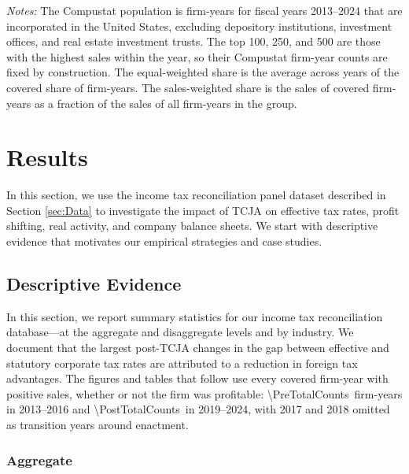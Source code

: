 \documentclass[11pt,letterpaper]{article}
\newcommand{\CountNum}[1]{\num[round-mode=places,round-precision=0]{#1}}
\begin{document}
\begin{table}[!tp]
\begin{threeparttable}
\bigskip
\begin{tablenotes}[flushleft]
\item[] \footnotesize{\textit{Notes:} The Compustat population is
\citet{CompustatAnnual} firm-years for fiscal years 2013--2024 that are
incorporated in the United States, excluding depository institutions,
investment offices, and real estate investment trusts. The
top 100, 250, and 500 are those with the highest sales within the year,
so their Compustat firm-year counts are fixed by construction. The
equal-weighted share is the average across years of the covered share
of firm-years. The sales-weighted share is the sales of covered
firm-years as a fraction of the sales of all firm-years in the group.}

\end{tablenotes}
\end{threeparttable}

\bigskip
\bigskip
\end{table}




\section{Results\label{sec:Results}}

In this section, we use the income tax reconciliation panel dataset described
in Section \ref{sec:Data} to investigate the impact of TCJA on effective tax rates,
profit shifting, real activity, and company balance sheets. 
We start with descriptive evidence that motivates our
empirical strategies and case studies.

\subsection{Descriptive Evidence\label{sec:DescriptiveEvidence}}

In this section, we report summary statistics for our income tax reconciliation
database---at the aggregate and disaggregate levels and by industry.
We document that the largest
post-TCJA changes in the gap between effective and statutory corporate tax
 rates are attributed to a reduction in foreign tax advantages.
The figures and tables that follow use every covered firm-year with
positive sales, whether or not the firm was profitable:
\CountNum{\PreTotalCounts}\ firm-years in 2013--2016 and
\CountNum{\PostTotalCounts}\ in 2019--2024, with 2017 and 2018 omitted
as transition years around enactment.

\subsubsection{Aggregate}
\end{document}
